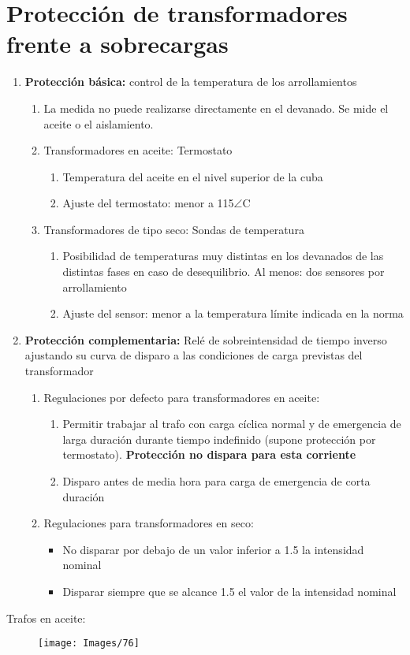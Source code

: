 \section{Protección de transformadores frente a sobrecargas}
\begin{enumerate}
	\item \textbf{Protección básica:} control de la temperatura de los arrollamientos
	\begin{enumerate}
		\item La medida no puede realizarse directamente en el devanado. Se mide el aceite o el aislamiento.
		\item Transformadores en aceite: Termostato
		\begin{enumerate}
			\item Temperatura del aceite en el nivel superior de la cuba
			\item Ajuste del termostato: menor a 115$\angle$C
		\end{enumerate}
		\item Transformadores de tipo seco: Sondas de temperatura
		\begin{enumerate}
			\item Posibilidad de temperaturas muy distintas en los devanados de las distintas fases en caso de desequilibrio. Al menos: dos sensores por arrollamiento
			\item Ajuste del sensor: menor a la temperatura límite indicada en la norma
		\end{enumerate}
	\end{enumerate}
	\item \textbf{Protección complementaria:} Relé de sobreintensidad de tiempo inverso ajustando su curva de disparo a las condiciones de carga previstas del transformador
	\begin{enumerate}
		\item Regulaciones por defecto para transformadores en aceite:
		\begin{enumerate}
			\item Permitir trabajar al trafo con carga cíclica normal y de emergencia de larga duración durante tiempo indefinido (supone protección por termostato). \textbf{Protección no dispara para esta corriente}
			\item Disparo antes de media hora para carga de emergencia de corta duración
		\end{enumerate}
		\item Regulaciones para transformadores en seco:
		\begin{itemize}
			\item No disparar por debajo de un valor inferior a 1.5 la intensidad nominal
			\item Disparar siempre que se alcance 1.5 el valor de la intensidad nominal 
		\end{itemize}
	\end{enumerate}
\end{enumerate}
Trafos en aceite:
\begin{figure}[H]
	\centering
	\texttt{[image: Images/76]}
	\label{fig:76}
\end{figure}

